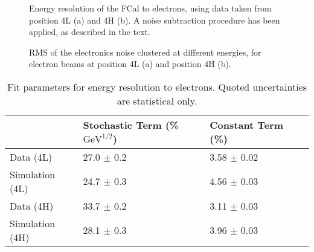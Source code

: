\begin{figure}[tb]
\begin{center}
\caption[Electron energy resolution]{Energy resolution of the FCal to electrons, using data taken from position 4L (a) and 4H (b). A noise subtraction procedure has been applied, as described in the text.}
\label{TBplot_electron_resolution}
\end{center}
\end{figure}

\begin{figure}[tb]
\begin{centering}
\caption[Noise contribution vs beam energy, electrons]{RMS of the electronics noise clustered at different energies, for electron beams at position 4L (a) and position 4H (b).  } 
\label{TBplot_noisevbeam_electrons}
\end{centering}
\end{figure}



\begin{table}[tb]
\begin{center}
\begin{tabular}{|l|l|l|l|}
\hline
& Stochastic Term (\% $\mathrm{GeV}^{1/2}$) & Constant Term (\%) \\
\hline
Data (4L) & 27.0 $\pm$ 0.2 & 3.58 $\pm$ 0.02\\
Simulation (4L) & 24.7 $\pm$ 0.3 & 4.56 $\pm$ 0.03\\
Data (4H) & 33.7 $\pm$ 0.2 & 3.11 $\pm$ 0.03\\
Simulation (4H) & 28.1 $\pm$ 0.3 & 3.96 $\pm$ 0.03\\
\hline
\end{tabular}
\end{center}
\caption[Electron resolution results]{Fit parameters for energy resolution to electrons. Quoted uncertainties are statistical only.}
\label{table_resolution_electrons}
\end{table}


